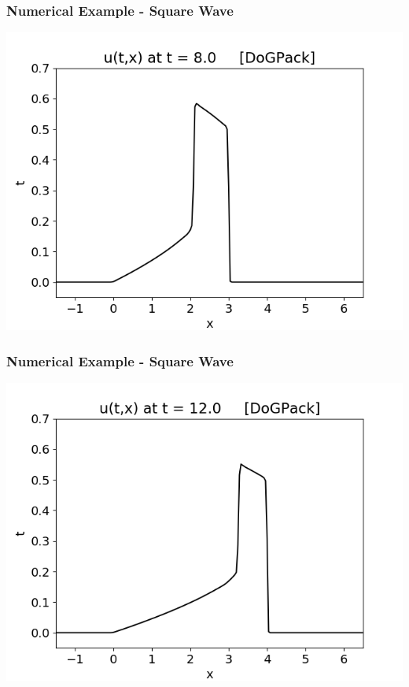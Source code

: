 \documentclass[10pt]{beamer}
\begin{document}
    \begin{frame}
      \frametitle{Numerical Example - Square Wave}
      \begin{center}
        \includegraphics[scale=0.6]{Figures/squarewave08.png}
      \end{center}
    \end{frame}
    \begin{frame}
      \frametitle{Numerical Example - Square Wave}
      \begin{center}
        \includegraphics[scale=0.6]{Figures/squarewave12.png}
      \end{center}
    \end{frame}
\end{document}
